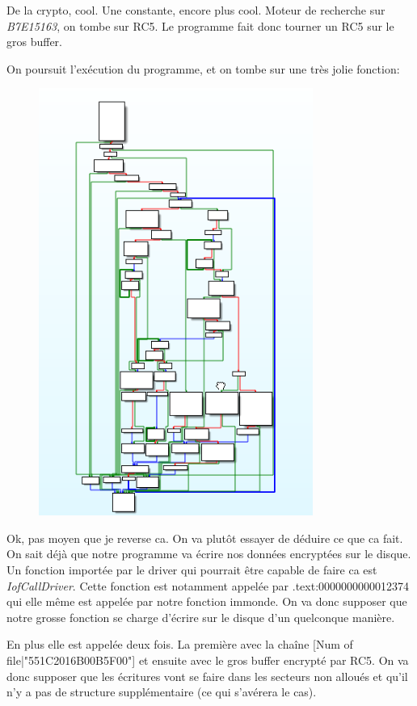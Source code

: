 \documentclass[14pt]{article}
\begin{document}
De la crypto, cool. Une constante, encore plus cool. Moteur de recherche sur {\em B7E15163}, on tombe sur RC5.
Le programme fait donc tourner un RC5 sur le gros buffer.

On poursuit l'exécution du programme, et on tombe sur une très jolie fonction:
\begin{figure}[H]
\includegraphics[width=0.8\textwidth]{./imgs/usb_driver_write_fat.png}
\centering
\end{figure}

Ok, pas moyen que je reverse ca. On va plutôt essayer de déduire ce que ca fait.
On sait déjà que notre programme va écrire nos données encryptées sur le disque.
Un fonction importée par le driver qui pourrait être capable de faire ca est {\em IofCallDriver}.
Cette fonction est notamment appelée par .text:0000000000012374 qui elle même est appelée par notre fonction immonde.
On va donc supposer que notre grosse fonction se charge d'écrire sur le disque d'un quelconque manière.

En plus elle est appelée deux fois. La première avec la chaîne [Num of file|"551C2016B00B5F00"] et ensuite avec le gros buffer encrypté par RC5. On va donc supposer que les écritures vont se faire dans les secteurs non alloués et qu'il n'y a pas de structure supplémentaire (ce qui s'avérera le cas).
\end{document}
